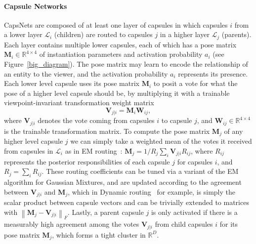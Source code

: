 \documentclass[letterpaper]{article} \usepackage{aaai20}  \usepackage{times}  \usepackage{helvet} \usepackage{courier}  \usepackage[hyphens]{url}  \usepackage{graphicx} \urlstyle{rm} \def\UrlFont{\rm}  \usepackage{graphicx}  \frenchspacing  \setlength{\pdfpagewidth}{8.5in}  \setlength{\pdfpageheight}{11in}  \nocopyright
\newcommand{\norm}[1]{\left\lVert#1\right\rVert}
\begin{document}
\paragraph{Capsule Networks}\label{sec: Capsule Networks}
CapsNets are composed of at least one layer of capsules in which capsules $i$ from a lower layer $\mathcal{L}_{i}$ (children) are routed to capsules $j$ in a higher layer $\mathcal{L}_{j}$ (parents). Each layer contains multiple lower capsules, each of which has a pose matrix $\mathbf{M}_{i} \in \mathbb{R}^{4\times4}$ of instantiation parameters and activation probability $a_i$ (see Figure~\ref{big_diagram}). The pose matrix may learn to encode the relationship of an entity to the viewer, and the activation probability $a_{i}$ represents its presence. Each lower level capsule uses its pose matrix $\mathbf{M}_{i}$ to posit a vote for what the pose of a higher level capsule should be, by multiplying it with a trainable viewpoint-invariant transformation weight matrix 
\begin{equation}
\mathbf{V}_{j|i} = \mathbf{M}_{i}\mathbf{W}_{ij},
\end{equation}
where $\mathbf{V}_{j|i}$ denotes the vote coming from capsules $i$ to capsule $j$, and $\mathbf{W}_{ij} \in \mathbb{R}^{4\times4}$ is the trainable transformation matrix. To compute the pose matrix $\mathbf{M}_{j}$ of any higher level capsule $j$ we can simply take a weighted mean of the votes it received from capsules in $\mathcal{L}_{i}$ as in EM routing~\cite{hinton2018matrix}: $\mathbf{M}_{j} = 1/R_j \sum_i{\mathbf{V}_{j|i}}R_{ij}$, where $R_{ij}$ represents the posterior responsibilities of each capsule $j$ for capsules $i$, and $R_j = \sum_i{R_{ij}}$. These routing coefficients can be tuned via a variant of the EM algorithm for Gaussian Mixtures, and are updated according to the agreement between $\mathbf{V}_{j|i}$ and $\mathbf{M}_{j}$, which in Dynamic routing~\cite{sabour2017dynamic} for example, is simply the scalar product between capsule vectors and can be trivially extended to matrices with $\norm{\mathbf{M}_{j} - \mathbf{V}_{j|i}}_{F}$. Lastly, a parent capsule $j$ is only activated if there is a measurably high agreement among the votes $\mathbf{V}_{j|i}$ from child capsules $i$ for its pose matrix $\mathbf{M}_j$, which forms a tight cluster in $\mathbb{R}^D$.
\end{document}
